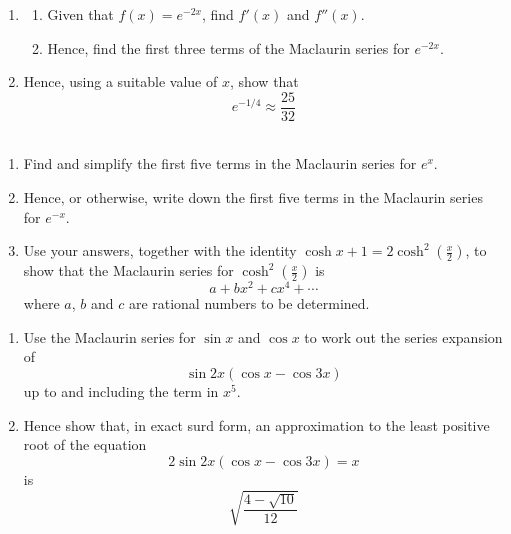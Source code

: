 \documentclass[leqno]{article}
\begin{document}
\djsFrontMatter
\begin{enumerate}[
  label=\textbf{\arabic*.},
  leftmargin=*,
  topsep=0pt,
  partopsep=0pt,
  parsep=0pt
]

\questionitem

\begin{enumerate}[label=\textbf{(\alph*)}]
  \item
  \begin{enumerate}[label=(\roman*)]
    \item Given that $f(x)=e^{-2x}$, find $f'(x)$ and $f''(x)$. 
    \item Hence, find the first three terms of the Maclaurin series for $e^{-2x}$.  \\
  \end{enumerate}
  \item Hence, using a suitable value of $x$, show that \[e^{-1/4}\approx \frac{25}{32}\]  \\
\end{enumerate}

\newpage


\questionitem

\begin{enumerate}[label=\textbf{(\alph*)}]
  \item Find and simplify the first five terms in the Maclaurin series for $e^x$.  \\
  \item Hence, or otherwise, write down the first five terms in the Maclaurin series for $e^{-x}$.  \\
  \item Use your answers, together with the identity $\cosh x + 1 = 2\cosh^2\left(\frac{x}{2}\right)$, to show that the Maclaurin series for $\cosh^2\left(\frac{x}{2}\right)$ is
  \[
  a + bx^2 + cx^4 + \cdots
  \]
  where $a$, $b$ and $c$ are rational numbers to be determined.  \\
\end{enumerate}

\newpage

\questionitem

\begin{enumerate}[label=\textbf{(\roman*)}]
  \item Use the Maclaurin series for $\sin x$ and $\cos x$ to work out the series expansion of \[\sin 2x(\cos x-\cos 3x)\] up to and including the term in $x^5$.  \\
  \item Hence show that, in exact surd form, an approximation to the least positive root of the equation \[2\sin 2x(\cos x-\cos 3x)=x\] is \[\sqrt{\frac{4-\sqrt{10}}{12}}
\] \\
\end{enumerate}


\end{enumerate}
\end{document}
